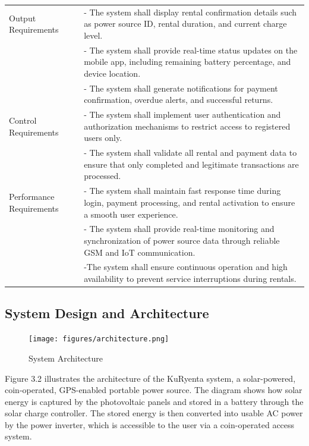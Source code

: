 {\begin{longtable}{p{4cm} p{9cm}}
	Output Requirements & - The system shall display rental confirmation details such as power source ID, rental duration, and current charge level. \\
	& - The system shall provide real-time status updates on the mobile app, including remaining battery percentage, and device location. \\
	& - The system shall generate notifications for payment confirmation, overdue alerts, and successful returns. \\
	\midrule
	
	Control Requirements & - The system shall implement user authentication and authorization mechanisms to restrict access to registered users only. \\
	& - The system shall validate all rental and payment data to ensure that only completed and legitimate transactions are processed. \\
	\midrule
	
	Performance Requirements & - The system shall maintain fast response time during login, payment processing, and rental activation to ensure a smooth user experience. \\
	& - The system shall provide real-time monitoring and synchronization of power source data through reliable GSM and IoT communication.\\
	& -The system shall ensure continuous operation and high availability to prevent service interruptions during rentals. \\
\end{longtable} 

\subsection{System Design and Architecture}

\begin{figure}[H]
	\centering
	\caption{System Architecture}
	\label{fig:architecture}
	\texttt{[image: figures/architecture.png]}
\end{figure}

Figure 3.2 illustrates the architecture of the KuRyenta system, a solar-powered, coin-operated, GPS-enabled portable power source. The diagram shows how solar energy is captured by the photovoltaic panels and stored in a  battery through the solar charge controller. The stored energy is then converted into usable AC power by the power inverter, which is accessible to the user via a coin-operated access system.

}
